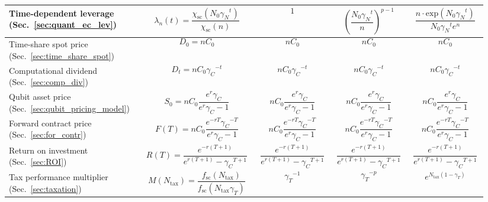 \begin{table}[!htb]
\begin{tabular}{|p{0.255\linewidth}|p{0.22\linewidth}|p{0.155\linewidth}|p{0.155\linewidth}|p{0.155\linewidth}|}
	\hline
	Time-dependent leverage (Sec.~\ref{sec:quant_ec_lev}) & \[\lambda_n(t)=\frac{\chi_\text{sc}(N_0{\gamma_N}^t)}{\chi_\text{sc}(n)}\] &  \[1\] & \[\left(\frac{N_0{\gamma_N}^t}{n}\right)^{p-1}\] & \[\frac{n \cdot \text{exp}(N_0{\gamma_N}^t)}{N_0{\gamma_N}^t e^n}\]\\
	\hline
	Time-share spot price (Sec.~\ref{sec:time_share_spot}) & \[D_0=n C_0\] & \[nC_0\] & \[nC_0\] & \[nC_0\]\\
	\hline
	Computational dividend (Sec.~\ref{sec:comp_div}) & \[D_t=n C_0 {\gamma_C}^{-t}\] & \[n C_0 {\gamma_C}^{-t}\] & \[n C_0 {\gamma_C}^{-t}\] & \[n C_0 {\gamma_C}^{-t}\]\\
	\hline
	Qubit asset price (Sec.~\ref{sec:qubit_pricing_model}) & \[S_0=n C_0 \frac{e^r \gamma_C}{e^r \gamma_C - 1}\] & \[n C_0 \frac{e^r \gamma_C}{e^r \gamma_C - 1}\] & \[n C_0 \frac{e^r \gamma_C}{e^r \gamma_C - 1}\] & \[n C_0 \frac{e^r \gamma_C}{e^r \gamma_C - 1}\]\\
	\hline
	Forward contract price (Sec.~\ref{sec:for_contr}) & \[F(T)=n C_0 \frac{e^{-rT}{\gamma_C}^{-T}}{e^{r}\gamma_C-1}\] & \[n C_0 \frac{e^{-rT}{\gamma_C}^{-T}}{e^{r}\gamma_C-1}\] & \[n C_0 \frac{e^{-rT}{\gamma_C}^{-T}}{e^{r}\gamma_C-1}\] & \[n C_0 \frac{e^{-rT}{\gamma_C}^{-T}}{e^{r}\gamma_C-1}\]\\
	\hline
	Return on investment (Sec.~\ref{sec:ROI}) & \[R(T)=\frac{e^{-r(T+1)}}{e^{r(T+1)}-{\gamma_C}^{T+1}}\] & \[\frac{e^{-r(T+1)}}{e^{r(T+1)}-{\gamma_C}^{T+1}}\] & \[\frac{e^{-r(T+1)}}{e^{r(T+1)}-{\gamma_C}^{T+1}}\] & \[\frac{e^{-r(T+1)}}{e^{r(T+1)}-{\gamma_C}^{T+1}}\]\\
	\hline
	Tax performance multiplier (Sec.~\ref{sec:taxation}) & \[M(N_\text{tax})=\frac{f_\text{sc}(N_\text{tax})}{f_\text{sc}(N_\text{tax} \gamma_T)}\] & \[{\gamma_T}^{-1}\] & \[{\gamma_T}^{-p}\] & \[e^{N_\text{tax}(1-\gamma_T)}\]\\
	\hline
\end{tabular}
\end{table}

\renewcommand{\arraystretch}{1}
\renewcommand{\tablename}{ALG.}